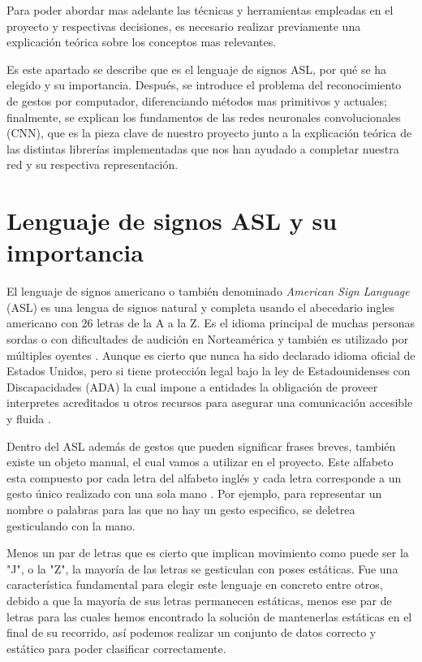 
Para poder abordar mas adelante las técnicas y herramientas empleadas en el proyecto y respectivas decisiones, es necesario realizar previamente una explicación teórica sobre los conceptos mas relevantes. 

Es este apartado se describe que es el lenguaje de signos ASL, por qué se ha elegido y su importancia. Después, se introduce el problema del reconocimiento de gestos por computador, diferenciando métodos mas primitivos y actuales; finalmente, se explican los fundamentos de las redes neuronales convolucionales (CNN), que es la pieza clave de nuestro proyecto junto a la explicación teórica de las distintas librerías implementadas que nos han ayudado a completar nuestra red y su respectiva representación.


\section{Lenguaje de signos ASL y su importancia}\label{lenguaje-de-signos-ASL-y-su-importancia}

El lenguaje de signos americano o también denominado \textit{American Sign Language} (ASL) es una lengua de signos natural y completa usando el abecedario ingles americano con 26 letras de la A a la Z. Es el idioma principal de muchas personas sordas o con dificultades de audición en Norteamérica y también es utilizado por múltiples oyentes \cite{web:asl_nidcd}. Aunque es cierto que nunca ha sido declarado idioma oficial de Estados Unidos, pero si tiene protección legal bajo la ley de Estadounidenses con Discapacidades (ADA) la cual impone a entidades la obligación de proveer interpretes acreditados u otros recursos para asegurar una comunicación accesible y fluida \cite{web:ada}.


Dentro del ASL además de gestos que pueden significar frases breves, también existe un objeto manual, el cual vamos a utilizar en el proyecto. Este alfabeto esta compuesto por cada letra del alfabeto inglés y cada letra corresponde a un gesto único realizado con una sola mano \cite{web:asl_nidcd}. Por ejemplo, para representar un nombre o palabras para las que no hay un gesto especifico, se deletrea gesticulando con la mano.

Menos un par de letras que es cierto que implican movimiento como puede ser la "J", o la "Z", la mayoría de las letras se gesticulan con poses estáticas. Fue una característica fundamental para elegir este lenguaje en concreto entre otros, debido a que la mayoría de sus letras permanecen estáticas, menos ese par de letras para las cuales hemos encontrado la solución de mantenerlas estáticas en el final de su recorrido, así podemos realizar un conjunto de datos correcto y estático para poder clasificar correctamente.

